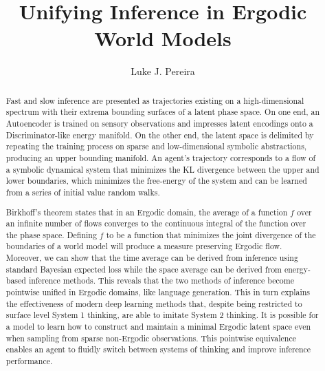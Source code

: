 \documentclass{article}
\title{Unifying Inference in Ergodic World Models}
\author{%
  Luke J. Pereira \\
}
\begin{document}
\maketitle

\begin{abstract}

Fast and slow inference are presented as trajectories existing on a high-dimensional spectrum with their extrema bounding surfaces of a latent phase space. On one end, an Autoencoder is trained on sensory observations and impresses latent encodings onto a Discriminator-like energy manifold. On the other end, the latent space is delimited by repeating the training process on sparse and low-dimensional symbolic abstractions, producing an upper bounding manifold. An agent's trajectory corresponds to a flow of a symbolic dynamical system that minimizes the KL divergence between the upper and lower boundaries, which minimizes the free-energy of the system and can be learned from a series of initial value random walks.

Birkhoff's theorem states that in an Ergodic domain, the average of a function $f$ over an infinite number of flows converges to the continuous integral of the function over the phase space. Defining $f$ to be a function that minimizes the joint divergence of the boundaries of a world model will produce a measure preserving Ergodic flow. Moreover, we can show that the time average can be derived from inference using standard Bayesian expected loss while the space average can be derived from energy-based inference methods. This reveals that the two methods of inference become pointwise unified in Ergodic domains, like language generation. This in turn explains the effectiveness of modern deep learning methods that, despite being restricted to surface level System 1 thinking, are able to imitate System 2 thinking. It is possible for a model to learn how to construct and maintain a minimal Ergodic latent space even when sampling from sparse non-Ergodic observations. This pointwise equivalence enables an agent to fluidly switch between systems of thinking and improve inference performance.





\end{abstract}
\end{document}
